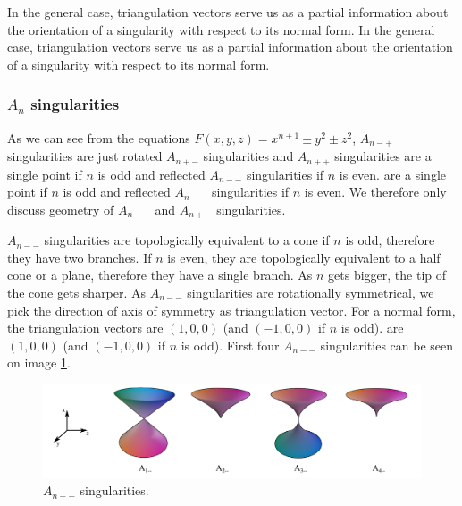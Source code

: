 In the general case, triangulation vectors serve us
as a partial information about the orientation of a singularity with 
respect to its normal form.
In the general case, triangulation vectors serve us
as a partial information about the orientation of a singularity with 
respect to its normal form.

\subsubsection*{$A_n$ singularities}

As we can see from the equations 
$F(x,y,z)=x^{n+1}\pm y^2\pm z^2$, $A_{n-+}$
singularities are just rotated $A_{n+-}$ singularities and $A_{n++}$ singularities
are a single point if $n$ is odd and reflected $A_{n--}$ singularities if $n$ is even. 
are a single point if $n$ is odd and reflected $A_{n--}$ singularities if $n$ is even. 
We therefore only discuss geometry of $A_{n--}$ and $A_{n+-}$ singularities.

$A_{n--}$ singularities are topologically equivalent to a cone if $n$ is odd, therefore
they have two branches.
If $n$ is even, they are topologically equivalent to a half cone or a plane, therefore
they have a single branch.
As $n$ gets bigger, the tip of the cone gets sharper. As $A_{n--}$ singularities
are rotationally symmetrical, we pick the direction of
axis of symmetry as triangulation vector. For a normal form, the triangulation vectors
are $(1, 0, 0)$ (and $(-1, 0, 0)$ if $n$ is odd).
are $(1, 0, 0)$ (and $(-1, 0, 0)$ if $n$ is odd).
First four $A_{n--}$ singularities can be seen on image \ref{img:4}.

\begin{figure}
    \centerline{\includegraphics[width=1\textwidth]{images/img4}}
    \caption[$A_{n--}$ singularities]
    {$A_{n--}$ singularities. \cite{singsurf}}
    \label{img:4}
\end{figure}


